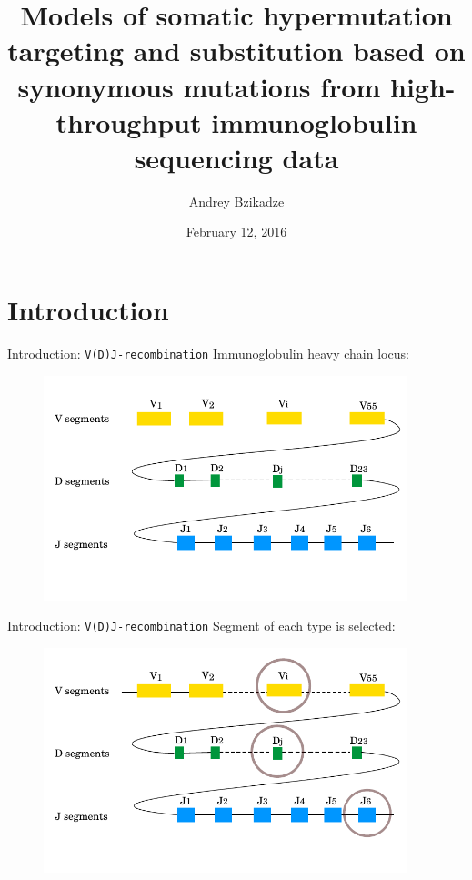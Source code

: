 \documentclass{beamer}\usepackage[]{graphicx}\usepackage[]{color}
\title[SHM model based on synonymous mutations]{Models of somatic hypermutation targeting and substitution based on synonymous mutations
    from high-throughput immunoglobulin sequencing data}
\author [Andrey Bzikadze]{Andrey Bzikadze}
\date {
February 12, 2016
}
\begin{document}
\begin{frame}
  \titlepage
\end{frame}

\section{Introduction}

\begin{frame}{Introduction: \texttt{V(D)J-recombination}}
  Immunoglobulin heavy chain locus:
  \begin{figure}[h]
    \center\includegraphics[width=300pt]{Pictures/vdj1.pdf}
 \end{figure}
\end{frame}

\begin{frame}{Introduction: \texttt{V(D)J-recombination}}
  Segment of each type is selected: 
  \begin{figure}[h]
    \center\includegraphics[width=300pt]{Pictures/vdj2_select_genes.pdf}
 \end{figure}
\end{frame}
\end{document}
